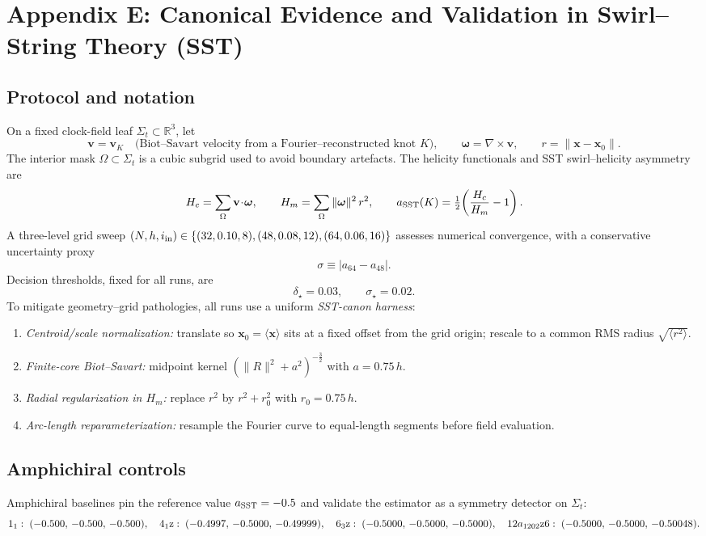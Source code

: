 \section*{Appendix E: Canonical Evidence and Validation in Swirl--String Theory (SST)}
\label{sec:canon-validation}

\subsection{Protocol and notation}
On a fixed clock-field leaf \(\Sigma_t\subset\mathbb{R}^3\), let
\[
	\mathbf v=\mathbf v_K \quad\text{(Biot--Savart velocity from a Fourier–reconstructed knot \(K\))},\qquad
	\boldsymbol\omega=\nabla\times\mathbf v,\qquad
	r=\|\mathbf x-\mathbf x_0\|.
\]
The interior mask \(\Omega\subset\Sigma_t\) is a cubic subgrid used to avoid boundary artefacts. The helicity functionals and SST swirl–helicity asymmetry are
\[
	H_c=\sum_{\Omega}\mathbf v\!\cdot\!\boldsymbol\omega,\qquad
	H_m=\sum_{\Omega}\|\boldsymbol\omega\|^2\,r^2,\qquad
	a_{\rm SST}(K)=\tfrac12\!\left(\frac{H_c}{H_m}-1\right).
\]
A three-level grid sweep \((N,h,i_{\rm in})\in\{(32,0.10,8),(48,0.08,12),(64,0.06,16)\}\) assesses numerical convergence, with a conservative uncertainty proxy
\[
	\sigma \equiv |a_{64}-a_{48}|.
\]
Decision thresholds, fixed for all runs, are
\[
	\delta_\star=0.03,\qquad \sigma_\star=0.02.
\]
To mitigate geometry–grid pathologies, all runs use a uniform \emph{SST-canon harness}:
\begin{enumerate}
	\item \emph{Centroid/scale normalization:} translate so \(\mathbf x_0=\langle\mathbf x\rangle\) sits at a fixed offset from the grid origin; rescale to a common RMS radius \(\sqrt{\langle r^2\rangle}\).
	\item \emph{Finite-core Biot--Savart:} midpoint kernel \((\|R\|^2+a^2)^{-\frac{3}{2}}\) with \(a=0.75\,h\).
	\item \emph{Radial regularization in \(H_m\):} replace \(r^2\) by \(r^2+r_0^2\) with \(r_0=0.75\,h\).
	\item \emph{Arc-length reparameterization:} resample the Fourier curve to equal-length segments before field evaluation.
\end{enumerate}

\subsection{Amphichiral controls}
Amphichiral baselines pin the reference value \(a_{\rm SST}=-0.5\) and validate the estimator as a symmetry detector on \(\Sigma_t\):
\[
	1_1:\;(-0.500,\,-0.500,\,-0.500),\quad
	4_1{\rm z}:\;(-0.4997,\,-0.5000,\,-0.49999),\quad
	6_3{\rm z}:\;(-0.5000,\,-0.5000,\,-0.5000),\quad
	12a_{1202}{\rm z6}:\;(-0.5000,\,-0.5000,\,-0.50048).
\]

